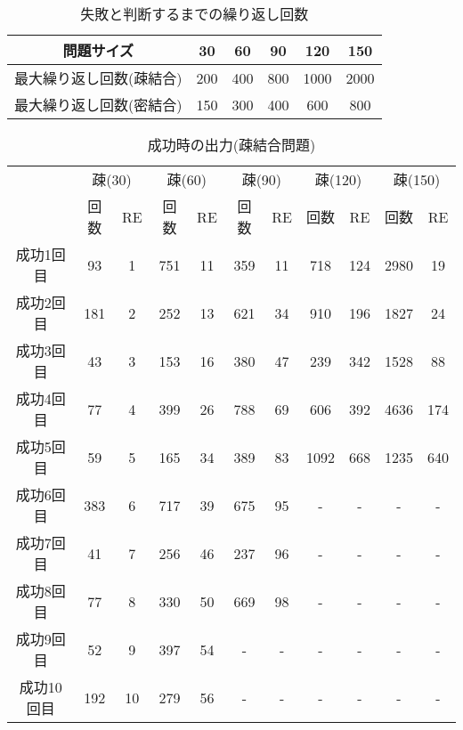 \documentclass[a4j]{jarticle}
\begin{document}
\begin{table}[htb]
 \begin{center}  
  \begin{tabular}[tb]{|c|c|c|c|c|c|} \hline
   問題サイズ& 30& 60& 90& 120& 150 \\ \hline
   最大繰り返し回数(疎結合)& 200& 400& 800& 1000& 2000 \\ \hline
   最大繰り返し回数(密結合)& 150& 300& 400& 600& 800 \\ \hline
  \end{tabular}
  \caption{失敗と判断するまでの繰り返し回数}
  \label{maxloop}
 \end{center}
\end{table}

\begin{table}[htb]
 \begin{center}
  \begin{tabular}[tb]{|c||c|c||c|c||c|c||c|c||c|c|} \hline
   & \multicolumn{2}{|c||}{疎(30)} & \multicolumn{2}{|c||}{疎(60)} &
   \multicolumn{2}{|c||}{疎(90)} & \multicolumn{2}{|c||}{疎(120)} &
   \multicolumn{2}{|c|}{疎(150)}  \\   \cline{2-11}
   & 回数& RE & 回数& RE & 回数& RE & 回数& RE & 回数& RE  \\ \hline \hline
   成功1回目& 93& 1& 751& 11& 359& 11& 718& 124& 2980& 19\\ \hline
   成功2回目& 181& 2& 252& 13& 621& 34& 910& 196& 1827& 24\\ \hline
   成功3回目& 43& 3& 153& 16& 380& 47& 239& 342& 1528& 88\\ \hline
   成功4回目& 77& 4& 399& 26& 788& 69& 606& 392& 4636& 174\\ \hline
   成功5回目& 59& 5& 165& 34& 389& 83& 1092& 668& 1235& 640\\ \hline
   成功6回目& 383& 6& 717& 39& 675& 95& -& -& -& -\\ \hline
   成功7回目& 41& 7& 256& 46& 237& 96& -& -& -& -\\ \hline
   成功8回目& 77& 8& 330& 50& 669& 98& -& -& -& -\\ \hline
   成功9回目& 52& 9& 397& 54& -& -& -& -& -& -\\ \hline
   成功10回目& 192& 10& 279& 56& -& -& -& -& -& -\\ \hline
  \end{tabular}
  \caption{成功時の出力(疎結合問題)}
  \label{loops}
 \end{center}
\end{table}
\end{document}
